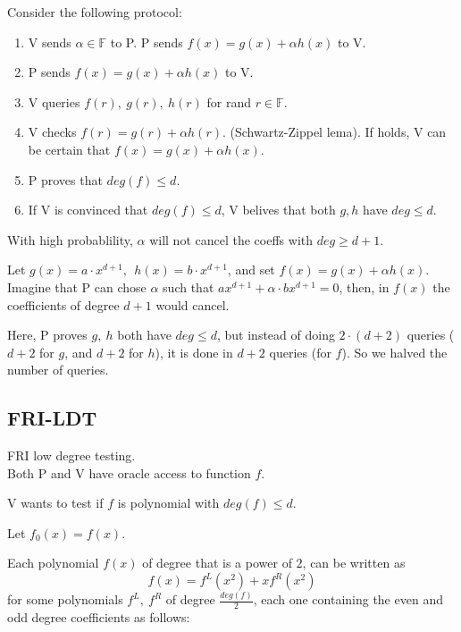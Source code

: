 \documentclass{article}
\theoremstyle{definition}
\begin{document}
Consider the following protocol:

\begin{enumerate}
	\item V sends $\alpha \in \mathbb{F}$ to P. P sends $f(x) = g(x) + \alpha h(x)$ to V.
	\item P sends $f(x)=g(x) + \alpha h(x)$ to V.
	\item V queries $f(r), ~g(r), ~h(r)$ for rand $r \in \mathbb{F}$.
	\item V checks $f(r)=g(r) + \alpha h(r)$. (Schwartz-Zippel lema).
		If holds, V can be certain that $f(x)=g(x)+ \alpha h(x)$.
	\item P proves that $deg(f) \leq d$. 
	\item If V is convinced that $deg(f) \leq d$, V belives that both $g, h$ have $deg \leq d$.
\end{enumerate}

With high probablility, $\alpha$ will not cancel the coeffs with $deg \geq d+1$. %

Let $g(x)=a \cdot x^{d+1}, ~~ h(x)=b \cdot x^{d+1}$, and set $f(x) = g(x) + \alpha h(x)$.
Imagine that P can chose $\alpha$ such that $a x^{d+1} + \alpha \cdot b x^{d+1} = 0$, then, in $f(x)$ the coefficients of degree $d+1$ would cancel.

\quad

Here, P proves $g,~h$ both have $deg \leq d$, but instead of doing $2 \cdot (d+2)$ queries ($d+2$ for $g$, and $d+2$ for $h$), it is done in $d+2$ queries (for $f$).
So we halved the number of queries.


\subsection{FRI-LDT}\label{sec:fri-ldt}
FRI low degree testing.\\
Both P and V have oracle access to function $f$.

V wants to test if $f$ is polynomial with $deg(f) \leq d$.

Let $f_0(x)=f(x)$.

Each polynomial $f(x)$ of degree that is a power of $2$, can be written as
$$f(x) = f^L(x^2) + x f^R(x^2)$$
for some polynomials $f^L,~f^R$ of degree $\frac{deg(f)}{2}$, each one containing the even and odd degree coefficients as follows:

\end{document}
